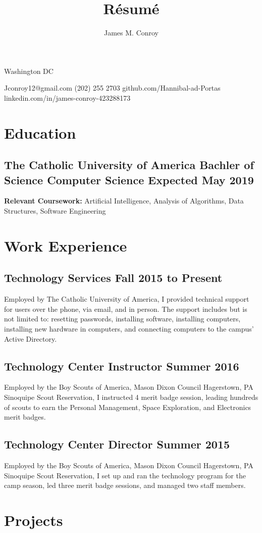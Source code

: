 \documentclass{article}
\author{James M. Conroy}
\title{R\'esum\'e}
\makeatletter
\renewcommand{\maketitle} {
	\begin{center}
	{\huge\bfseries
	\theauthor}

	Washington DC
	\end{center}


	Jconroy12@gmail.com
	(202) 255 2703
	github.com/Hannibal-ad-Portas
	linkedin.com/in/james-conroy-423288173
}
\makeatother
\begin{document}
\maketitle
\section{Education}
\subsection{The Catholic University of America \hfill Bachler of Science Computer Science \hfill  Expected May 2019 }

\textbf {Relevant Coursework:}
Artificial Intelligence,
Analysis of Algorithms,
Data Structures,
Software Engineering

\section{Work Experience}
\subsection{Technology Services \hfill Fall 2015 to Present}
Employed by The Catholic University of America,
I provided technical support for users over the phone, via email, and in person.
The support includes but is not limited to:
resetting passwords,
installing software,
installing computers,
installing new hardware in computers,
and
connecting computers to the campus' Active Directory.

\subsection{Technology Center Instructor \hfill Summer 2016}
Employed by the Boy Scouts of America, Mason Dixon Council Hagerstown, PA Sinoquipe Scout Reservation,
I instructed 4 merit badge session, leading hundreds of scouts to earn the
Personal Management,
Space Exploration,
and
Electronics
merit badges.
\subsection{Technology Center Director \hfill Summer 2015}
Employed by the Boy Scouts of America, Mason Dixon Council Hagerstown, PA Sinoquipe Scout Reservation,
I set up and ran the technology program for the camp season,
led three merit badge sessions,
and managed two staff members.
\section{Projects}
\end{document}
